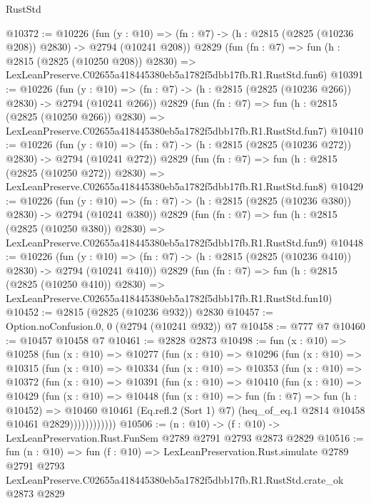 \begin{lexlean}{RustStd}
\begin{coremodule}
@10372 := @10226
    (fun (y : @10) => (fn : @7) -> (h : @2815 (@2825 (@10236 @208)) @2830) -> @2794 (@10241 @208))
    @2829
    (fun (fn : @7) =>
    fun (h : @2815 (@2825 (@10250 @208)) @2830) =>
    LexLeanPreserve.C02655a418445380eb5a1782f5dbb17fb.R1.RustStd.fun6)
@10391 := @10226
    (fun (y : @10) => (fn : @7) -> (h : @2815 (@2825 (@10236 @266)) @2830) -> @2794 (@10241 @266))
    @2829
    (fun (fn : @7) =>
    fun (h : @2815 (@2825 (@10250 @266)) @2830) =>
    LexLeanPreserve.C02655a418445380eb5a1782f5dbb17fb.R1.RustStd.fun7)
@10410 := @10226
    (fun (y : @10) => (fn : @7) -> (h : @2815 (@2825 (@10236 @272)) @2830) -> @2794 (@10241 @272))
    @2829
    (fun (fn : @7) =>
    fun (h : @2815 (@2825 (@10250 @272)) @2830) =>
    LexLeanPreserve.C02655a418445380eb5a1782f5dbb17fb.R1.RustStd.fun8)
@10429 := @10226
    (fun (y : @10) => (fn : @7) -> (h : @2815 (@2825 (@10236 @380)) @2830) -> @2794 (@10241 @380))
    @2829
    (fun (fn : @7) =>
    fun (h : @2815 (@2825 (@10250 @380)) @2830) =>
    LexLeanPreserve.C02655a418445380eb5a1782f5dbb17fb.R1.RustStd.fun9)
@10448 := @10226
    (fun (y : @10) => (fn : @7) -> (h : @2815 (@2825 (@10236 @410)) @2830) -> @2794 (@10241 @410))
    @2829
    (fun (fn : @7) =>
    fun (h : @2815 (@2825 (@10250 @410)) @2830) =>
    LexLeanPreserve.C02655a418445380eb5a1782f5dbb17fb.R1.RustStd.fun10)
@10452 := @2815 (@2825 (@10236 @932)) @2830
@10457 := Option.noConfusion.{0, 0} (@2794 (@10241 @932)) @7
@10458 := @777 @7
@10460 := @10457 @10458 @7
@10461 := @2828 @2873
@10498 := fun (x : @10) =>
  @10258
    (fun (x : @10) =>
    @10277
      (fun (x : @10) =>
      @10296
        (fun (x : @10) =>
        @10315
          (fun (x : @10) =>
          @10334
            (fun (x : @10) =>
            @10353
              (fun (x : @10) =>
              @10372
                (fun (x : @10) =>
                @10391
                  (fun (x : @10) =>
                  @10410
                    (fun (x : @10) =>
                    @10429
                      (fun (x : @10) =>
                      @10448
                        (fun (x : @10) =>
                        fun (fn : @7) =>
                        fun (h : @10452) =>
                        @10460
                          @10461
                          (Eq.refl.{2} (Sort 1) @7)
                          (heq_of_eq.{1} @2814 @10458 @10461 @2829))))))))))))
@10506 := (n : @10) -> (f : @10) -> LexLeanPreservation.Rust.FunSem @2789 @2791 @2793 @2873 @2829
@10516 := fun (n : @10) =>
  fun (f : @10) =>
  LexLeanPreservation.Rust.simulate
    @2789
    @2791
    @2793
    LexLeanPreserve.C02655a418445380eb5a1782f5dbb17fb.R1.RustStd.crate_ok
    @2873
    @2829
\end{coremodule}
\end{lexlean}
